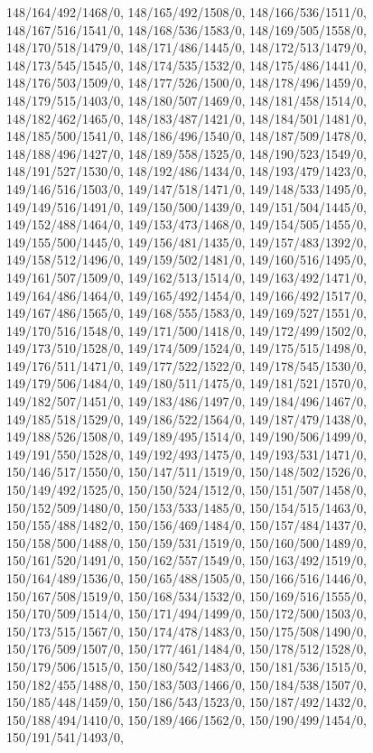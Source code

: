 {148/164/492/1468/0,%
148/165/492/1508/0,%
148/166/536/1511/0,%
148/167/516/1541/0,%
148/168/536/1583/0,%
148/169/505/1558/0,%
148/170/518/1479/0,%
148/171/486/1445/0,%
148/172/513/1479/0,%
148/173/545/1545/0,%
148/174/535/1532/0,%
148/175/486/1441/0,%
148/176/503/1509/0,%
148/177/526/1500/0,%
148/178/496/1459/0,%
148/179/515/1403/0,%
148/180/507/1469/0,%
148/181/458/1514/0,%
148/182/462/1465/0,%
148/183/487/1421/0,%
148/184/501/1481/0,%
148/185/500/1541/0,%
148/186/496/1540/0,%
148/187/509/1478/0,%
148/188/496/1427/0,%
148/189/558/1525/0,%
148/190/523/1549/0,%
148/191/527/1530/0,%
148/192/486/1434/0,%
148/193/479/1423/0,%
149/146/516/1503/0,%
149/147/518/1471/0,%
149/148/533/1495/0,%
149/149/516/1491/0,%
149/150/500/1439/0,%
149/151/504/1445/0,%
149/152/488/1464/0,%
149/153/473/1468/0,%
149/154/505/1455/0,%
149/155/500/1445/0,%
149/156/481/1435/0,%
149/157/483/1392/0,%
149/158/512/1496/0,%
149/159/502/1481/0,%
149/160/516/1495/0,%
149/161/507/1509/0,%
149/162/513/1514/0,%
149/163/492/1471/0,%
149/164/486/1464/0,%
149/165/492/1454/0,%
149/166/492/1517/0,%
149/167/486/1565/0,%
149/168/555/1583/0,%
149/169/527/1551/0,%
149/170/516/1548/0,%
149/171/500/1418/0,%
149/172/499/1502/0,%
149/173/510/1528/0,%
149/174/509/1524/0,%
149/175/515/1498/0,%
149/176/511/1471/0,%
149/177/522/1522/0,%
149/178/545/1530/0,%
149/179/506/1484/0,%
149/180/511/1475/0,%
149/181/521/1570/0,%
149/182/507/1451/0,%
149/183/486/1497/0,%
149/184/496/1467/0,%
149/185/518/1529/0,%
149/186/522/1564/0,%
149/187/479/1438/0,%
149/188/526/1508/0,%
149/189/495/1514/0,%
149/190/506/1499/0,%
149/191/550/1528/0,%
149/192/493/1475/0,%
149/193/531/1471/0,%
150/146/517/1550/0,%
150/147/511/1519/0,%
150/148/502/1526/0,%
150/149/492/1525/0,%
150/150/524/1512/0,%
150/151/507/1458/0,%
150/152/509/1480/0,%
150/153/533/1485/0,%
150/154/515/1463/0,%
150/155/488/1482/0,%
150/156/469/1484/0,%
150/157/484/1437/0,%
150/158/500/1488/0,%
150/159/531/1519/0,%
150/160/500/1489/0,%
150/161/520/1491/0,%
150/162/557/1549/0,%
150/163/492/1519/0,%
150/164/489/1536/0,%
150/165/488/1505/0,%
150/166/516/1446/0,%
150/167/508/1519/0,%
150/168/534/1532/0,%
150/169/516/1555/0,%
150/170/509/1514/0,%
150/171/494/1499/0,%
150/172/500/1503/0,%
150/173/515/1567/0,%
150/174/478/1483/0,%
150/175/508/1490/0,%
150/176/509/1507/0,%
150/177/461/1484/0,%
150/178/512/1528/0,%
150/179/506/1515/0,%
150/180/542/1483/0,%
150/181/536/1515/0,%
150/182/455/1488/0,%
150/183/503/1466/0,%
150/184/538/1507/0,%
150/185/448/1459/0,%
150/186/543/1523/0,%
150/187/492/1432/0,%
150/188/494/1410/0,%
150/189/466/1562/0,%
150/190/499/1454/0,%
150/191/541/1493/0,%
}

